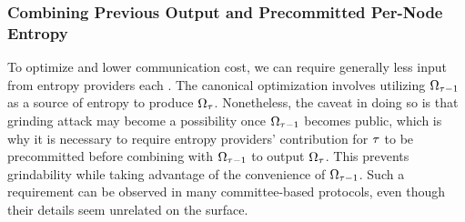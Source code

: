 \subsubsection{Combining Previous Output and Precommitted Per-Node Entropy}
\label{subsubsection:precommitted}
To optimize and lower communication cost, we can require generally less input from entropy providers each \epoch. The canonical optimization involves utilizing $\Omega_{\tau - 1}$ as a source of entropy to produce $\Omega_\tau$. Nonetheless, the caveat in doing so is that grinding attack may become a possibility once $\Omega_{\tau - 1}$ becomes public, which is why it is necessary to require entropy providers' contribution for \epoch $\tau$ to be precommitted before combining with $\Omega_{\tau - 1}$ to output $\Omega_\tau$. This prevents grindability while taking advantage of the convenience of $\Omega_{\tau - 1}$. Such a requirement can be observed in many committee-based protocols, even though their details seem unrelated on the surface.

